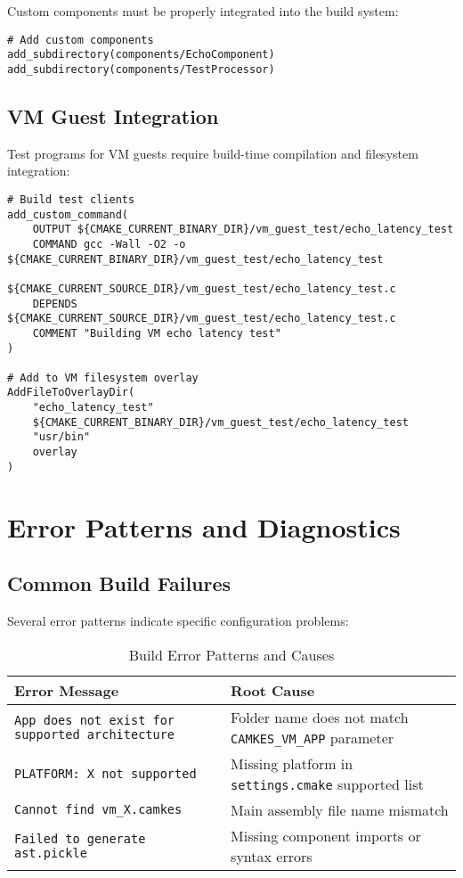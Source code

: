 \documentclass[12pt,a4paper]{article}
\begin{document}
Custom components must be properly integrated into the build system:

\begin{lstlisting}[style=cmake, caption=Component subdirectory inclusion]
# Add custom components
add_subdirectory(components/EchoComponent)
add_subdirectory(components/TestProcessor)
\end{lstlisting}

\subsection{VM Guest Integration}

Test programs for VM guests require build-time compilation and filesystem integration:

\begin{lstlisting}[style=cmake, caption=VM guest program integration]
# Build test clients
add_custom_command(
    OUTPUT ${CMAKE_CURRENT_BINARY_DIR}/vm_guest_test/echo_latency_test
    COMMAND gcc -Wall -O2 -o ${CMAKE_CURRENT_BINARY_DIR}/vm_guest_test/echo_latency_test 
            ${CMAKE_CURRENT_SOURCE_DIR}/vm_guest_test/echo_latency_test.c
    DEPENDS ${CMAKE_CURRENT_SOURCE_DIR}/vm_guest_test/echo_latency_test.c
    COMMENT "Building VM echo latency test"
)

# Add to VM filesystem overlay
AddFileToOverlayDir(
    "echo_latency_test"
    ${CMAKE_CURRENT_BINARY_DIR}/vm_guest_test/echo_latency_test
    "usr/bin"
    overlay
)
\end{lstlisting}

\section{Error Patterns and Diagnostics}

\subsection{Common Build Failures}

Several error patterns indicate specific configuration problems:

\begin{table}[htbp]
\centering
\caption{Build Error Patterns and Causes}
\label{tab:error-patterns}
\begin{tabular}{@{}p{6cm}p{8cm}@{}}
\toprule
Error Message & Root Cause \\
\midrule
\texttt{App does not exist for supported architecture} & Folder name does not match \texttt{CAMKES\_VM\_APP} parameter \\
\texttt{PLATFORM: X not supported} & Missing platform in \texttt{settings.cmake} supported list \\
\texttt{Cannot find vm\_X.camkes} & Main assembly file name mismatch \\
\texttt{Failed to generate ast.pickle} & Missing component imports or syntax errors \\
\bottomrule
\end{tabular}
\end{table}
\end{document}
